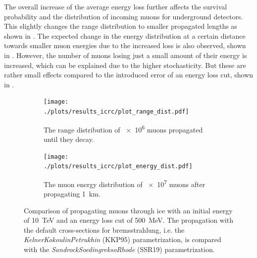 The overall increase of the average energy loss further affects the survival probability and the distribution of incoming muons for underground detectors.
This slightly changes the range distribution to smaller propagated lengths as shown in .
The expected change in the energy distribution at a certain distance towards smaller muon energies due to the increased loss is also observed, shown in .
However, the number of muons losing just a small amount of their energy is increased, which can be explained due to the higher stochasticity.
But these are rather small effects compared to the introduced error of an energy loss cut, shown in .
\begin{figure}
    \centering
    \begin{subfigure}{0.47\textwidth}
        \centering
        \texttt{[image: ./plots/results\_icrc/plot\_range\_dist.pdf]}
        \caption{The range distribution of \num{e6} muons propagated until they decay.}
        \label{fig:range_ssr_kkp}
    \end{subfigure}
    \hfill
    \begin{subfigure}{0.47\textwidth}
        \centering
        \texttt{[image: ./plots/results\_icrc/plot\_energy\_dist.pdf]}
        \caption{The muon energy distribution of \num{e7} muons after propagating \SI{1}{km}.}
        \label{fig:energy_ssr_kkp}
    \end{subfigure}
    \caption{Comparison of propagating muons through ice with an initial energy of \SI{10}{TeV} and an energy loss cut of \SI{500}{MeV}. The propagation with the default cross-sections for bremsstrahlung, i.e. the \textit{KelnerKokoulinPetrukhin} (KKP95) parametrization, is compared with the \textit{SandrockSoedingreksoRhode} (SSR19) parametrization.}
    \label{fig:range_energy_ssr_kkp}
\end{figure}

